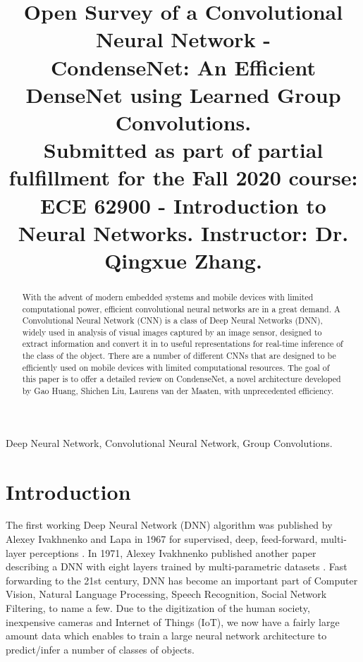 \documentclass[conference]{IEEEtran}
\begin{document}
\title{Open Survey of a Convolutional Neural Network -
\\CondenseNet: An Efficient DenseNet using Learned Group Convolutions.\\
{\footnotesize Submitted as part of partial fulfillment for the Fall 2020 course: ECE 62900 - Introduction to Neural Networks. Instructor: Dr. Qingxue Zhang.}
}

\author{
}

\maketitle

\begin{abstract}
With the advent of modern embedded systems and mobile devices with limited computational power, efficient convolutional neural networks are in a great demand. A Convolutional Neural Network (CNN) is a class of Deep Neural Networks (DNN), widely used in analysis of visual images captured by an image sensor, designed to extract information and convert it in to useful representations for real-time inference of the class of the object. There are a number of different CNNs that are designed to be efficiently used on mobile devices with limited computational resources. The goal of this paper is to offer a detailed review on CondenseNet, a novel architecture developed by Gao Huang, Shichen Liu, Laurens van der Maaten, with unprecedented efficiency.\\
\end{abstract}

\begin{IEEEkeywords}
Deep Neural Network, Convolutional Neural Network, Group Convolutions.
\end{IEEEkeywords}

\section{\textbf{Introduction}}
The first working Deep Neural Network (DNN) algorithm was published by Alexey Ivakhnenko and Lapa in 1967 for supervised, deep, feed-forward,
multi-layer perceptions \cite{1}. In 1971, Alexey Ivakhnenko published another paper describing a DNN with eight layers trained by multi-parametric datasets \cite{2}. Fast forwarding to the 21st century, DNN has become an important part of Computer Vision, Natural Language Processing, Speech Recognition, Social Network Filtering, to name a few. Due to the digitization of the human society, inexpensive cameras and Internet of Things (IoT), we now have a fairly large amount data which enables to train a large neural network architecture to predict/infer a number of classes of objects.
\end{document}
